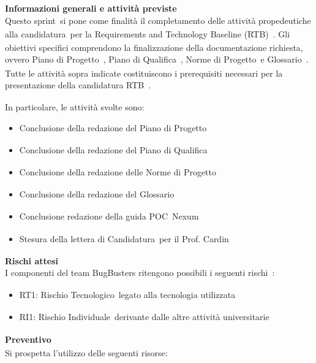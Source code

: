 \documentclass[a4paper,12pt]{article}
\newcommand{\pediceG}{\texorpdfstring{\textsubscript{\scalebox{0.6}{\textbf{G}}}~}{G}}
\begin{document}
\noindent\textbf{Informazioni generali e attività previste}\\
Questo sprint\pediceG si pone come finalità il completamento delle attività propedeutiche alla candidatura\pediceG per la Requirements and Technology Baseline (RTB)\pediceG. Gli obiettivi specifici comprendono la finalizzazione della documentazione richiesta, ovvero Piano di Progetto\pediceG, Piano di Qualifica\pediceG, Norme di Progetto\pediceG e Glossario\pediceG. Tutte le attività sopra indicate costituiscono i prerequisiti necessari per la presentazione della candidatura RTB\pediceG.

In particolare, le attività svolte sono:
\begin{itemize}
    \item Conclusione della redazione del Piano di Progetto\pediceG
    \item Conclusione della redazione del Piano di Qualifica\pediceG
    \item Conclusione della redazione delle Norme di Progetto\pediceG
    \item Conclusione della redazione del Glossario\pediceG
    \item Conclusione redazione della guida POC\pediceG Nexum
    \item Stesura della lettera di Candidatura\pediceG per il Prof. Cardin
\end{itemize}

\noindent\textbf{Rischi attesi}\\
I componenti del team BugBusters ritengono possibili i seguenti rischi\pediceG:
\begin{itemize}
    \item RT1: Rischio Tecnologico\pediceG legato alla tecnologia utilizzata
    \item RI1: Rischio Individuale\pediceG derivante dalle altre attività universitarie
\end{itemize}

\noindent\textbf{Preventivo\pediceG}\\
Si prospetta l'utilizzo delle seguenti risorse:
\end{document}
